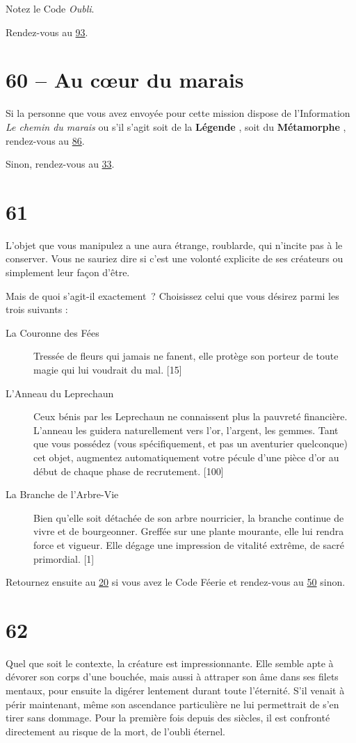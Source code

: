 \documentclass{report}
\newcommand{\gsection}[1]{
    \section{#1}
    \label{section-#1}
}
\newcommand{\glink}[1]{\hyperref[section-#1]{#1}}
\newcommand{\hero}[1]{
    \textbf{#1}
}
\begin{document}
Notez le Code \emph{Oubli}.

Rendez-vous au \glink{93}.

\gsection{60 – Au cœur du marais}

Si la personne que vous avez envoyée pour cette mission dispose de l'Information \emph{Le chemin du marais} ou s'il s'agit soit de la \hero{Légende}, soit du \hero{Métamorphe}, rendez-vous au \glink{86}.

Sinon, rendez-vous au \glink{33}.

\gsection{61}

L'objet que vous manipulez a une aura étrange, roublarde, qui n'incite pas à le conserver. Vous ne sauriez dire si c'est une volonté explicite  de ses créateurs ou simplement leur façon d'être.

Mais de quoi s'agit-il exactement ? Choisissez celui que vous désirez parmi les trois suivants :

\begin{description}
\item[La Couronne des Fées] Tressée de fleurs qui jamais ne fanent, elle protège son porteur de toute magie qui lui voudrait du mal. [15]
\item[L'Anneau du Leprechaun] Ceux bénis par les Leprechaun ne connaissent plus la pauvreté financière. L'anneau les guidera naturellement vers l'or, l'argent, les gemmes. Tant que vous possédez (vous spécifiquement, et pas un aventurier quelconque) cet objet, augmentez automatiquement votre pécule d'une pièce d'or au début de chaque phase de recrutement. [100]
\item[La Branche de l'Arbre-Vie] Bien qu'elle soit détachée de son arbre nourricier, la branche continue de vivre et de bourgeonner. Greffée sur une plante mourante, elle lui rendra force et vigueur. Elle dégage une impression de vitalité extrême, de sacré primordial. [1]
\end{description}

Retournez ensuite au \glink{20} si vous avez le Code Féerie et rendez-vous au \glink{50} sinon.

\gsection{62}

Quel que soit le contexte, la créature est impressionnante. Elle semble apte à dévorer son corps d'une bouchée, mais aussi à attraper son âme dans ses filets mentaux, pour ensuite la digérer lentement durant toute l'éternité. S'il venait à périr maintenant, même son ascendance particulière ne lui permettrait de s'en tirer sans dommage. Pour la première fois depuis des siècles, il est confronté directement au risque de la mort, de l'oubli éternel.
\end{document}

